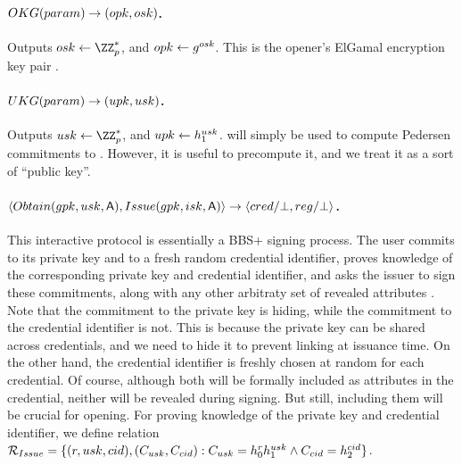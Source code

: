 \paragraph{$OKG(param) \rightarrow (opk,osk)$.} %
Outputs $\osk \gets \ZZ^*_p$, and $opk \gets g^{osk}$. This is the
opener's ElGamal encryption key pair \needcite.

\paragraph{$UKG(param) \rightarrow (upk,usk)$.} %
Outputs $\usk \gets \ZZ^*_p$, and $upk \gets h_1^{usk}$. \upk will
simply be used to compute Pedersen commitments \needcite to \usk. However,
it is useful to precompute it, and we treat it as a sort of ``public key''.

\paragraph{$\langle Obtain(gpk,usk,\mathsf{A}),Issue(gpk,isk,\mathsf{A}) \rangle
  \rightarrow \langle cred/\bot,reg/\bot \rangle$.} %
This interactive protocol is essentially a BBS+ signing  process. The user
commits to its private key and to a fresh random credential identifier, proves
knowledge of the corresponding private key and credential identifier, and
asks the issuer to sign these commitments, along with any other arbitraty set
of revealed attributes \Attrs. Note that the commitment to the private key is
hiding, while the commitment to the credential identifier is not. This is
because the private key can be shared across credentials, and we need to hide
it to prevent linking at issuance time. On the other hand, the credential
identifier is freshly chosen at random for each credential. Of course, although
both will be formally included as attributes in the credential, neither will be
revealed during signing. But still, including them will be crucial for opening.
For proving knowledge of the private key and credential identifier, we define
relation $\mathcal{R}_{Issue} = \lbrace (r, usk, cid),
(C_{usk},C_{cid}): C_{usk} = h_0^rh_1^{usk} \land C_{cid} =
h_2^{cid}\rbrace$.

